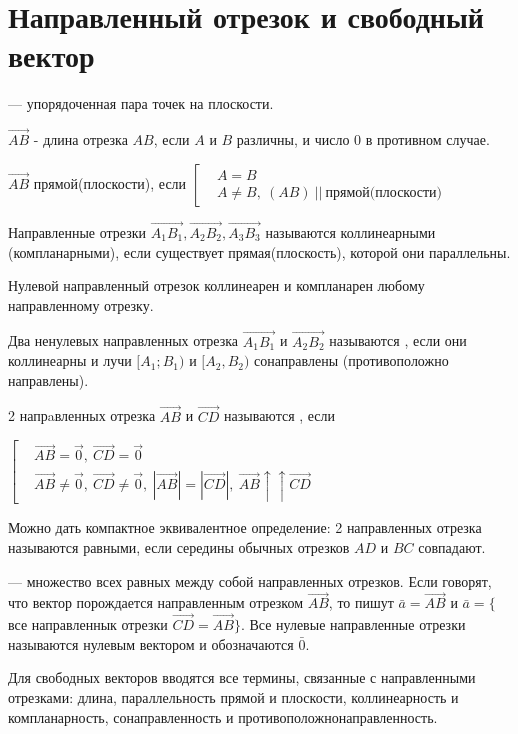\chapter{Направленный отрезок и свободный вектор}
\begin{opred}
 --- упорядоченная пара точек на плоскости.
\end{opred}
\begin{opred}
 $\vec{AB}$ - длина отрезка $AB$, если $A$ и $B$ различны, и число 0 в противном случае.
\end{opred}
\begin{opred}
$\vec{AB}$  прямой(плоскости), если $\left[\begin{aligned}
& A=B \\
& A\neq B,\ (AB)\ ||\ \mbox{прямой(плоскости)}
\end{aligned}\right.$
\end{opred}
\begin{opred}
Направленные отрезки $\vec{A_1B_1},\vec{A_2B_2},\vec{A_3B_3}$ называются коллинеарными (компланарными), если существует прямая(плоскость), которой они параллельны.
\end{opred}
\begin{remark}
Нулевой направленный отрезок коллинеарен и компланарен любому направленному отрезку.
\end{remark}
\begin{opred}
Два ненулевых направленных отрезка $\vec{A_1B_1}$ и $\vec{A_2B_2}$ называются , если они коллинеарны и лучи $[A_1;B_1)$ и $[A_2,B_2)$ сонаправлены (противоположно направлены).
\end{opred}
\begin{opred}
2 напрaвленных отрезка $\vec{AB}$ и $\vec{CD}$ называются , если

$\left[\begin{aligned}
&\vec{AB}=\vec{0},\ \vec{CD}=\vec{0}\\
&\vec{AB}\neq\vec{0},\ \vec{CD}\neq\vec{0},\ |\vec{AB}|=|\vec{CD}|,\ \vec{AB}\uparrow\uparrow\vec{CD}
\end{aligned}\right.$
\end{opred}
\begin{remark}
Можно дать компактное эквивалентное определение: 2 направленных отрезка называются равными, если середины обычных отрезков $AD$ и $BC$ совпадают.
\end{remark}
\begin{opred}
 --- множество всех равных между собой направленных отрезков. Если говорят, что вектор порождается направленным отрезком $\vec{AB}$, то пишут $\bar{a}=\vec{AB}$ и $\bar{a}=\{$все направленнык отрезки $\vec{CD}=\vec{AB}\}$. Все нулевые направленные отрезки называются нулевым вектором и обозначаются $\bar{0}$.

Для свободных векторов вводятся все термины, связанные с направленными отрезками: длина, параллельность прямой и плоскости, коллинеарность и компланарность, сонаправленность и противоположнонаправленность.
\end{opred}
